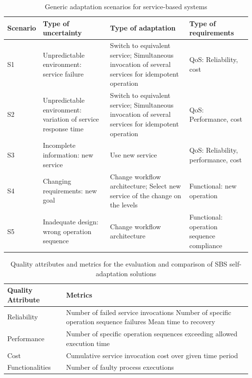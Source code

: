\begin{table}[ht!b]
	\centering
	\begin{tabular}{|l|p{3.5cm}|p{3.5cm}|p{3.5cm}|}
		\hline 
		\textbf{Scenario} & \textbf{Type of uncertainty} & \textbf{Type of adaptation} & \textbf{Type of requirements} \\ 
		\hline 
		S1 & Unpredictable environment: service failure  & Switch to equivalent service; Simultaneous invocation of several services for idempotent operation & QoS: Reliability, cost \\ 
		\hline 
		S2 & Unpredictable environment: variation of service response time & Switch to equivalent service; Simultaneous invocation of several services for idempotent operation & QoS: Performance, cost \\ 
		\hline 
		S3 & Incomplete information: new service & Use new service & QoS: Reliability, performance, cost \\ 
		\hline 
		S4 & Changing requirements: new goal & Change workflow architecture; Select new service of the change on the levels & Functional: new operation \\ 
		\hline 
		S5 & Inadequate design: wrong operation sequence & Change workflow architecture & Functional: operation sequence compliance \\ 
		\hline
		
	\end{tabular} 
	\caption[TAS Scenarios]{Generic adaptation scenarios for service-based systems}
	\label{tab:tas-scenarios}
\end{table}

\begin{table}[ht!b]
	\centering
	\begin{tabular}{|p{3cm}|p{10cm}|}
		\hline 
		\textbf{Quality Attribute} & \textbf{Metrics} \\ 
		\hline 
		Reliability & Number of failed service invocations
		Number of specific operation sequence failures
		Mean time to recovery \\ 
		\hline 
		Performance & Number of specific operation sequences exceeding allowed execution time \\ 
		\hline 
		Cost & Cumulative service invocation cost over given time period \\ 
		\hline 
		Functionalities & Number of faulty process executions \\ 
		\hline 
		
	\end{tabular} 
	\caption[TAS Metrics]{Quality attributes and metrics for the evaluation and comparison of SBS self-adaptation solutions}
	\label{tab:tas-metrics}
\end{table}

